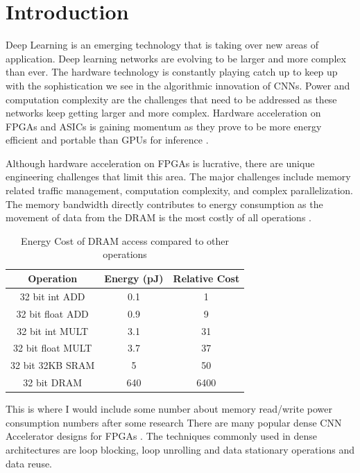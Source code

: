 \documentclass[conference]{IEEEtran}
\begin{document}
\section{Introduction}
Deep Learning is an emerging technology that is taking over new areas of application. Deep learning networks are evolving to be larger and more complex than ever\cite{he2016deep, szegedy2015going}. The hardware technology is constantly playing catch up to keep up with the sophistication we see in the algorithmic innovation of CNNs. Power and computation complexity are the challenges that need to be addressed as these networks keep getting larger and more complex. 
Hardware acceleration on FPGAs\cite{Lacey2016} and ASICs is gaining momentum as they prove to be more energy efficient and portable than GPUs for inference\cite{Fowers:2012:PEC:2145694.2145704} \cite{sze2017efficient}.  

Although hardware acceleration on FPGAs is lucrative, there are unique engineering challenges that limit this area. The major challenges include memory related traffic management, computation complexity, and complex parallelization. The memory bandwidth directly contributes to energy consumption as the movement of data from the DRAM is the most costly of all operations \cite{han2016eie}.

\begin{table}[!ht]
\centering
\caption{Energy Cost of DRAM access compared to other operations\cite{han2016eie}}
\label{energy}
\begin{tabular}{ccc}
\hline
\textbf{Operation} & \textbf{Energy (pJ)} & \textbf{Relative Cost} \\ \hline
32 bit int ADD     & 0.1                  & 1                      \\
32 bit float ADD   & 0.9                  & 9                      \\
32 bit int MULT    & 3.1                  & 31                     \\
32 bit float MULT  & 3.7                  & 37                     \\
32 bit 32KB SRAM   & 5                    & 50                     \\
32 bit DRAM        & 640                  & 6400                   \\ \hline
\end{tabular}
\end{table}

\color{magenta} This is where I would include some number about memory read/write power consumption numbers after some research \color{black}
There are many popular dense CNN Accelerator designs for FPGAs \cite{chakradhar2010dynamically,zhang2015optimizing,Eyeriss}.
The techniques commonly used in dense architectures are loop blocking, loop unrolling and data stationary operations and data reuse. 
\end{document}
